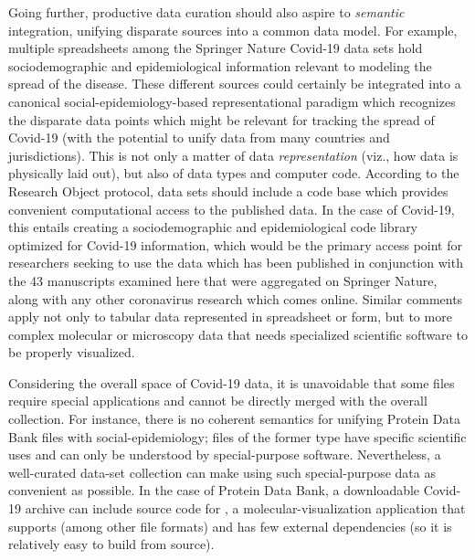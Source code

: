 \documentclass[11pt,letterpaper]{article}
\newcommand{\IQmol}{\resizebox{!}{7pt}{\AcronymText{IQmol}}}
\newcommand{\textscc}[1]{{\color{orr!35!black}{{%
						\fontfamily{Cabin-TLF}\fontseries{b}\selectfont{\textsc{\scriptsize{#1}}}}}}}
\newcommand{\AcronymText}[1]{{\textscc{#1}}}
\newcommand{\CSV}{{\resizebox{!}{7pt}{\AcronymText{CSV}}}}
\newcommand{\PDB}{{\resizebox{!}{7pt}{\AcronymText{PDB}}}}
\newcommand{\p}[1]{

\vspace{.85em}#1}
\begin{document}
\p{Going further, productive data curation should also 
aspire to \textit{semantic} integration, unifying disparate 
sources into a common data model.  For example, multiple 
spreadsheets among the Springer Nature Covid-19 data sets 
hold sociodemographic and epidemiological information relevant 
to modeling the spread of the disease.  These different 
sources could certainly be integrated into a canonical 
social-epidemiology-based representational paradigm which 
recognizes the disparate data points which might be 
relevant for tracking the spread of Covid-19 (with the 
potential to unify data from many countries and 
jurisdictions).  This is not only a matter of data
\textit{representation} (viz., how data is physically 
laid out), but also of data types and computer code.  
According to the Research Object protocol, 
data sets should include a code base 
which provides convenient computational access to the 
published data.  In the case of Covid-19, this entails 
creating a sociodemographic and epidemiological code 
library optimized for Covid-19 information, which would 
be the primary access point for researchers seeking to 
use the data which has been published in conjunction with 
the 43 manuscripts examined here that were aggregated 
on Springer Nature, along with any other coronavirus 
research which comes online.  Similar comments 
apply not only to tabular data represented in spreadsheet 
or \CSV{} form, but to more complex molecular or 
microscopy data that needs specialized scientific software 
to be properly visualized.}

\p{Considering the overall space of Covid-19 data, it is 
unavoidable that some files require special applications 
and cannot be directly merged with the overall collection.  
For instance, there is no coherent semantics for 
unifying Protein Data Bank files with social-epidemiology; 
files of the former type have specific scientific uses and 
can only be understood by special-purpose software.  
Nevertheless, a well-curated data-set collection can 
make using such special-purpose data as convenient as 
possible.  In the case of Protein Data Bank, a downloadable 
Covid-19 archive can include source code for \IQmol{}, a 
molecular-visualization application that supports 
\PDB{} (among other file formats) and has few 
external dependencies (so it is relatively easy to 
build from source).}
\end{document}
